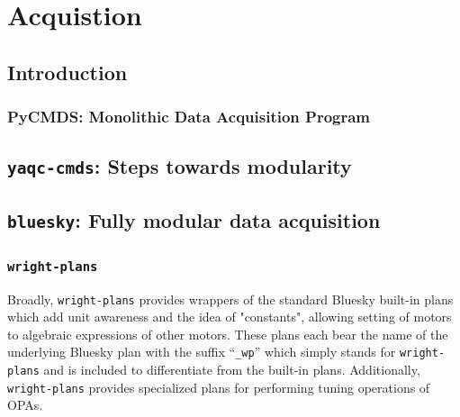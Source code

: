\chapter{Acquistion} \label{cha:acq}

\newcommand\biab{\texttt{bluesky-in-a-box} }
\newcommand\yaq{\texttt{yaq} }
\newcommand\wrightfakes{\texttt{wright-fakes} }
\newcommand\wrightplans{\texttt{wright-plans} }

\clearpage

\section{Introduction}  %

\subsection{PyCMDS: Monolithic Data Acquisition Program}

\clearpage

\section{\texttt{yaqc-cmds}: Steps towards modularity}  %

\section{\texttt{bluesky}: Fully modular data acquisition}  %

\subsection{\wrightplans}


Broadly, \wrightplans provides wrappers of the standard Bluesky built-in plans which add unit awareness and the idea of "constants", allowing setting of motors to algebraic expressions of other motors.
These plans each bear the name of the underlying Bluesky plan with the suffix ``\texttt{\_wp}'' which simply stands for \wrightplans and is included to differentiate from the built-in plans.
Additionally, \wrightplans provides specialized plans for performing tuning operations of OPAs.

